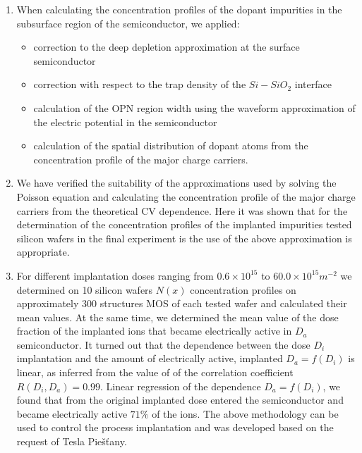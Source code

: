 \begin{enumerate}
\item When calculating the concentration profiles of the dopant
  impurities in the subsurface region of the semiconductor, we
  applied:

  \begin{itemize}
  \item correction to the deep depletion approximation at the surface
    semiconductor
  \item correction with respect to the trap density of the $Si-SiO_{2}$ interface
  \item calculation of the OPN region width using the waveform approximation
    of the electric potential in the semiconductor
  \item calculation of the spatial distribution of dopant atoms from
    the concentration profile of the major charge carriers.
  \end{itemize}

\item We have verified the suitability of the approximations used by
  solving the Poisson equation and calculating the concentration
  profile of the major charge carriers from the theoretical CV
  dependence. Here it was shown that for the determination of the
  concentration profiles of the implanted impurities tested silicon
  wafers in the final experiment is the use of the above approximation
  is appropriate.

\item For different implantation doses ranging from $0.6 \times
  10^{15}$ to $60.0 \times 10^{15} m^{-2}$ we determined on 10 silicon
  wafers $N(x)$ concentration profiles on approximately 300 structures
  MOS of each tested wafer and calculated their mean values. At the
  same time, we determined the mean value of the dose fraction of the
  implanted ions that became electrically active in $D_{a}$
  semiconductor. It turned out that the dependence between the dose
  $D_{i}$ implantation and the amount of electrically active,
  implanted $D_{a}=f(D_{i})$ is linear, as inferred from the value of
  of the correlation coefficient $R(D_{i},D_{a})=0.99$.  Linear
  regression of the dependence $D_{a}=f(D_{i})$, we found that from
  the original implanted dose entered the semiconductor and became
  electrically active $71\%$ of the ions. The above methodology can be
  used to control the process implantation and was developed based on
  the request of Tesla Piešťany.


\end{enumerate}
